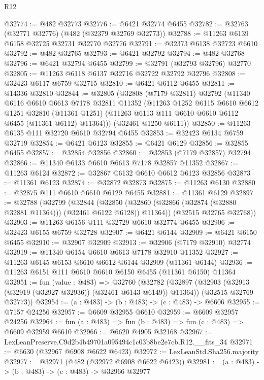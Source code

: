 \begin{lexlean}{R12}
\begin{coremodule}
@32774 := @482 @32773
@32776 := @6421 @32774 @6455
@32782 := @32763 (@32771 @32776) (@482 (@32379 @32769 @32773))
@32788 := @11263 @6139 @6158 @32725 @32731 @32770 @32776
@32791 := @32373 @6138 @32723 @6610
@32792 := @482 @32765
@32793 := @6421 @32792
@32794 := @482 @32768
@32796 := @6421 @32794 @6455
@32799 := @32791 (@32793 @32796) @32770
@32805 := @11263 @6118 @6137 @32716 @32722 @32792 @32796
@32808 := @32423 @6117 @6759 @32715
@32810 := @6421 @6112 @6455
@32811 := @14336 @32810
@32844 := @32805
    (@32808
      (@7179 @32811)
      @32792
      (@11340
        @6116
        @6610
        @6613
        @7178
        @32811
        @11352
        (@11263
          @1252
          @6115
          @6610
          @6612
          @1251
          @32810
          (@11361 @1251)
          (@11263 @6113 @111 @6610 @6610 @6112 @6455 (@11361 @6112) @11364)))
      (@32461 @1250 @6111))
@32850 := @11263 @6135 @111 @32720 @6610 @32794 @6455
@32853 := @32423 @6134 @6759 @32719
@32854 := @6421 @6123
@32855 := @6421 @6129
@32856 := @32855 @6455
@32857 := @32854 @32856
@32860 := @32853 (@7179 @32857) @32794
@32866 := @11340 @6133 @6610 @6613 @7178 @32857 @11352
@32867 := @11263 @6124
@32872 := @32867 @6132 @6610 @6612 @6123 @32856
@32873 := @11361 @6123
@32874 := @32872 @32873
@32875 := @11263 @6130
@32880 := @32875 @111 @6610 @6610 @6129 @6455
@32881 := @11361 @6129
@32897 := @32788
    (@32799
      (@32844
        (@32850 (@32860 (@32866 (@32874 (@32880 @32881 @11364))) (@32461 @6122 @6128)) @11364))
      (@32515 @32765 @32768))
@32903 := @11263 @6156 @111 @32729 @6610 @32774 @6455
@32906 := @32423 @6155 @6759 @32728
@32907 := @6421 @6144
@32909 := @6421 @6150 @6455
@32910 := @32907 @32909
@32913 := @32906 (@7179 @32910) @32774
@32919 := @11340 @6154 @6610 @6613 @7178 @32910 @11352
@32927 := @11263 @6145 @6153 @6610 @6612 @6144 @32909 (@11361 @6144)
@32936 := @11263 @6151 @111 @6610 @6610 @6150 @6455 (@11361 @6150) @11364
@32951 := fun (value : @483) =>
  @32760
    (@32782
      (@32897 (@32903 (@32913 (@32919 (@32927 @32936)) (@32461 @6143 @6149)) @11364))
      (@32515 @32769 @32773))
@32954 := (a : @483) -> (b : @483) -> (c : @483) -> @6606
@32955 := @7157 @24256
@32957 := @6609 @32955 @6610
@32959 := @6609 @32957 @24256
@32964 := fun (a : @483) => fun (b : @483) => fun (c : @483) => @6609 @32959 @6610
@32966 := @6620 @4905 @32168
@32967 := LexLeanPreserve.C9d2b4b49701a095494c1c03b8be2e7cb.R12.__fits_34
@32971 := @6630 (@32967 @6908 @6622 @6423)
@32972 := LexLeanStd.Sha256.majority
@32977 := @32971 (@482 (@32972 @6908 @6622 @6423))
@32981 := (a : @483) -> (b : @483) -> (c : @483) -> @32966 @32977

\end{coremodule}
\end{lexlean}

